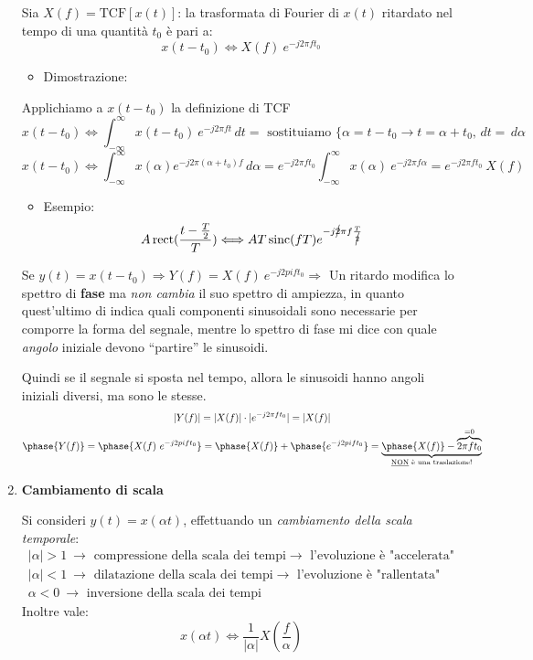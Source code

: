 \documentclass[
]{article}
\providecommand{\tightlist}{%
  \setlength{\itemsep}{0pt}\setlength{\parskip}{0pt}}
\begin{document}
\begin{enumerate}
  Sia \(X(f)=\text{TCF}[x(t)]\): la trasformata di Fourier di \(x(t)\)
  ritardato nel tempo di una quantità \(t_0\) è pari a: \[
  x(t-t_0) \Longleftrightarrow X(f) \ e^{-j2\pi ft_0}
  \]

  \begin{itemize}
  \tightlist
  \item
    Dimostrazione:
  \end{itemize}

  Applichiamo a \(x(t-t_0)\) la definizione di TCF \[
  x(t-t_0) \Longleftrightarrow \int_{-\infty}^{\infty} x(t-t_0) \ e^{-j2\pi ft} \,dt = \text{ sostituiamo } \Big\{\alpha = t-t_0 \to t=\alpha +t_0, \,dt = \,d\alpha
  \] \[
  x(t-t_0) \Longleftrightarrow \int_{-\infty}^{\infty} x(\alpha) e^{-j2\pi (\alpha +t_0)f} \,d\alpha = e^{-j2\pi ft_0} \int_{-\infty}^{\infty} x(\alpha)\ e^{-j2\pi f\alpha} =  e^{-j2\pi ft_0} \ X(f) 
  \]

  \begin{itemize}
  \tightlist
  \item
    Esempio: \[
    A\mathop{\mathrm{rect}}(\frac{t-\frac{T}{2}}{T}) \Longleftrightarrow AT\mathop{\mathrm{sinc}}(fT)e^{-j\cancel{2}\pi f\frac{T}{\cancel{2}}}
    \]
  \end{itemize}

  Se
  \(y(t)=x(t-t_0) \Rightarrow Y(f) = X(f) \ e^{-j2 pi ft_0} \Rightarrow\)
  Un ritardo modifica lo spettro di \textbf{fase} ma \emph{non cambia}
  il suo spettro di ampiezza, in quanto quest'ultimo di indica quali
  componenti sinusoidali sono necessarie per comporre la forma del
  segnale, mentre lo spettro di fase mi dice con quale \emph{angolo}
  iniziale devono ``partire'' le sinusoidi.

  Quindi se il segnale si sposta nel tempo, allora le sinusoidi hanno
  angoli iniziali diversi, ma sono le stesse. \begin{gather*}
  |Y(f)| = |X(f)|\cdot |e^{-j2\pi ft_0}| = |X(f)| \\
  \phase{Y(f)} = \phase{X(f) \ e^{-j2 pi ft_0}} = \phase{X(f)} + \phase{e^{-j2 pi ft_0}} = \underbrace{\phase{X(f)} - \overbrace{2\pi ft_0}^{=0}}_{\text{\underline{NON} è una traslazione!}}
  \end{gather*}
\item
  \textbf{Cambiamento di scala}

  Si consideri \(y(t)=x(\alpha t)\), effettuando un \emph{cambiamento
  della scala temporale}: \[
  \begin{array}{cl}
  |\alpha | > 1 \ \to \text{ compressione della scala dei tempi} \to \text{ l'evoluzione è "accelerata"}\\
  |\alpha | < 1 \ \to \text{ dilatazione della scala dei tempi} \to \text{ l'evoluzione è "rallentata"}\\
  \alpha  < 0 \ \to \text{ inversione della scala dei tempi}
  \end{array} 
  \] Inoltre vale: \[
  x(\alpha t) \Longleftrightarrow \frac{1}{|\alpha |} X(\frac{f}{\alpha})
  \]


\end{enumerate}
\end{document}
